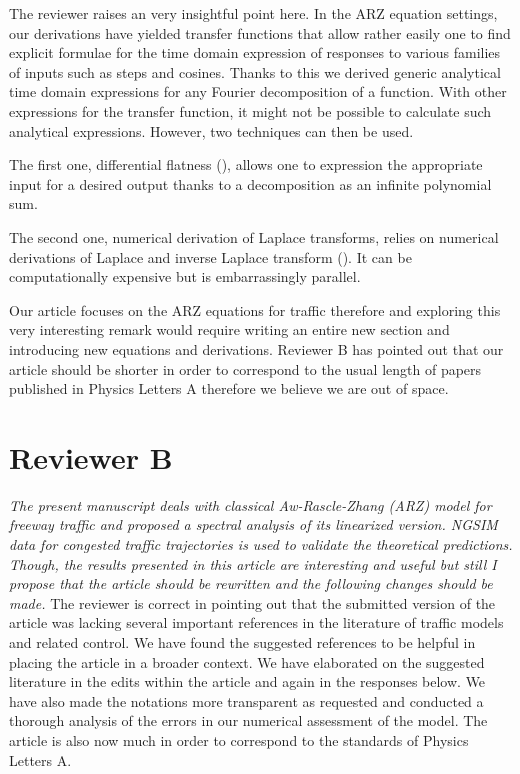 \documentclass{article}
\begin{document}
The reviewer raises an very insightful point here. In the ARZ equation settings, our derivations have yielded transfer functions that allow rather easily one to find explicit formulae for the time domain expression of responses to various families of inputs such as steps and cosines. Thanks to this we derived generic analytical time domain expressions for any Fourier decomposition of a function.
With other expressions for the transfer function, it might not be possible to calculate such analytical expressions. However, two techniques can then be used.

The first one, differential flatness (\cite{1184520}), allows one to expression the appropriate input for a desired output thanks to a decomposition as an infinite polynomial sum.

The second one, numerical derivation of Laplace transforms, relies on numerical derivations of Laplace and inverse Laplace transform (\cite{inverse}). It can be computationally expensive but is embarrassingly parallel.

Our article focuses on the ARZ equations for traffic therefore and exploring this very interesting remark would require writing an entire new section and introducing new equations and derivations. Reviewer B has pointed out that our article should be shorter in order to correspond to the usual length of papers published in Physics Letters A therefore we believe we are out of space.


\newpage

\section{Reviewer B}
\emph{
The present manuscript deals with classical Aw-Rascle-Zhang (ARZ) model for freeway traffic and proposed a spectral analysis of its linearized version. NGSIM data for congested traffic trajectories is used to validate the theoretical predictions. Though, the results presented in this article are interesting and useful but still I propose that the article should be rewritten and the following changes should be made.
}
The reviewer is correct in pointing out that the submitted version of the article was lacking several important references in the literature of traffic models and related control. We have found the suggested references to be helpful in placing the article in a broader context. We have elaborated on the suggested literature in the edits within the article and again in the responses below. We have also made the notations more transparent as requested and conducted a thorough analysis of the errors in our numerical assessment of the model. The article is also now much in order to correspond to the standards of Physics Letters A.\\
\end{document}
